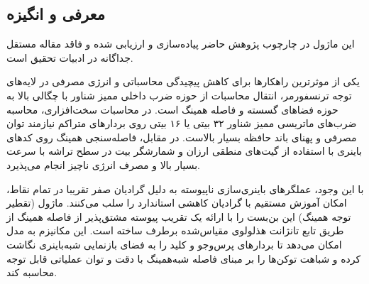 \subsection{معرفی و انگیزه}
این ماژول در چارچوب پژوهش حاضر پیاده‌سازی و ارزیابی شده و فاقد مقاله مستقل جداگانه در ادبیات تحقیق است.

یکی از موثرترین راهکارها برای کاهش پیچیدگی محاسباتی و انرژی مصرفی در لایه‌های توجه ترنسفورمر، انتقال محاسبات از حوزه ضرب داخلی ممیز شناور با چگالی بالا به حوزه فضاهای گسسته و فاصله همینگ  است. در محاسبات سخت‌افزاری، محاسبه ضرب‌های ماتریسی ممیز شناور ۳۲ بیتی یا ۱۶ بیتی روی بردارهای متراکم نیازمند توان مصرفی و پهنای باند حافظه بسیار بالاست. در مقابل، فاصله‌سنجی همینگ روی کدهای باینری با استفاده از گیت‌های منطقی ارزان  و شمارشگر بیت  در سطح تراشه با سرعت بسیار بالا و مصرف انرژی ناچیز انجام می‌پذیرد.

با این وجود، عملگرهای باینری‌سازی ناپیوسته به دلیل گرادیان صفر تقریبا در تمام نقاط، امکان آموزش مستقیم با گرادیان کاهشی استاندارد را سلب می‌کنند. ماژول  (تقطیر توجه همینگ) این بن‌بست را با ارائه یک تقریب پیوسته مشتق‌پذیر از فاصله همینگ از طریق تابع تانژانت هذلولوی مقیاس‌شده  برطرف ساخته است. این مکانیزم به مدل امکان می‌دهد تا بردارهای پرس‌وجو و کلید را به فضای بازنمایی شبه‌باینری نگاشت کرده و شباهت توکن‌ها را بر مبنای فاصله شبه‌همینگ با دقت و توان عملیاتی قابل توجه محاسبه کند.
